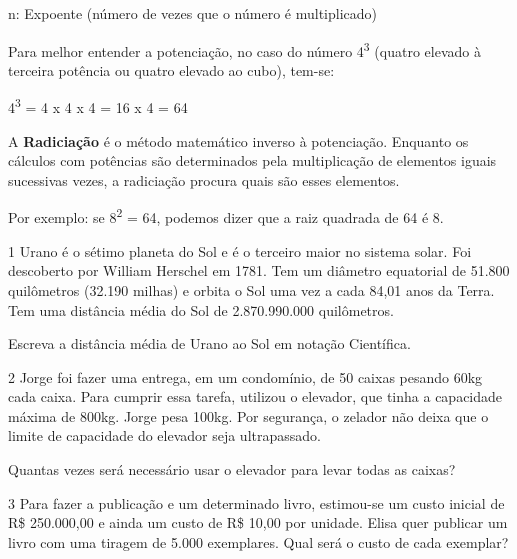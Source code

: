 \begin{escolha}
{n: Expoente (número de vezes que o número é multiplicado)

Para melhor entender a potenciação, no caso do número
4\textsuperscript{3} (quatro elevado à terceira potência ou quatro
elevado ao cubo), tem-se:

4\textsuperscript{3} = 4 x 4 x 4 = 16 x 4 = 64

A \textbf{Radiciação} é o método matemático inverso à potenciação. Enquanto os
cálculos com potências são determinados pela multiplicação de elementos
iguais sucessivas vezes, a radiciação procura quais são esses elementos.

Por exemplo: se 8\textsuperscript{2} = 64, podemos dizer que a raiz quadrada de
64 é 8.


\num{1} Urano é o sétimo planeta do Sol e é o terceiro maior no sistema
solar. Foi descoberto por William Herschel em 1781. Tem um diâmetro
equatorial de 51.800 quilômetros (32.190 milhas) e orbita o Sol uma vez
a cada 84,01 anos da Terra. Tem uma distância média do Sol de
2.870.990.000 quilômetros.

Escreva a distância média de Urano ao Sol em notação Científica.


\num{2} Jorge foi fazer uma entrega, em um condomínio, de 50 caixas
pesando 60kg cada caixa. Para cumprir essa tarefa, utilizou o elevador,
que tinha a capacidade máxima de 800kg. Jorge pesa 100kg. Por segurança,
o zelador não deixa que o limite de capacidade do elevador seja ultrapassado.

Quantas vezes será necessário usar o elevador para levar todas as
caixas?


\num{3} Para fazer a publicação e um determinado livro, estimou-se um
custo inicial de R\$ 250.000,00 e ainda um custo de R\$ 10,00 por
unidade. Elisa quer publicar um livro com uma tiragem de 5.000
exemplares. Qual será o custo de cada exemplar?


}
\end{escolha}

